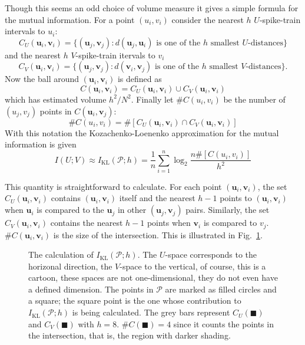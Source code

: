 \documentclass[12pt]{article}
\renewcommand{\u}{\mathbf{u}}
\renewcommand{\v}{\mathbf{v}}
\begin{document}
Though this seems an odd choice of volume measure it gives a simple
formula for the mutual information. For a point $(u_i,v_i)$ consider
the nearest $h$ $U$-spike-train intervals to $u_i$:
\begin{equation}
C_U(\u_i,\v_i)=\{(\u_j,\v_j): d(\u_j,\u_i)\mbox{ is one of the }h\mbox{ smallest $U$-distances} \}
\end{equation}
and the nearest $h$ $V$-spike-train itervals to $v_i$
\begin{equation}
C_V(\u_i,\v_i)=\{(\u_j,\v_j): d(\v_i,\v_j)\mbox{ is one of the }h\mbox{ smallest $V$-distances}\}.
\end{equation}
Now the ball around $(\u_i,\v_i)$ is defined as
\begin{equation}
C(\u_i,\v_i)=C_U(\u_i,\v_i)\cup C_V(\u_i,\v_i)
\end{equation}
which has estimated volume $h^2/N^2$. Finally let $\#C(u_i,v_i)$ be the
number of $(u_j,v_j)$ points in $C(\u_i,\v_j)$:
\begin{equation}
\#C(u_i,v_i)=\#[C_U(\u_i,\v_i)\cap C_V(\u_i,\v_i)]
\end{equation}
With this notation the  Kozachenko-Loenenko approximation for the mutual information is given
\begin{equation}
I(U;V)\approx I_{\text{KL}}(\mathcal{P};h)=\frac{1}{n}\sum_{i=1}^n\log_2{\frac{n\#[C(u_i,v_i)]}{h^2}}
\end{equation}

This quantity is straightforward to calculate. For each point
$(\u_i,\v_i)$, the set $C_U(\u_i,\v_i)$ contains $(\u_i,\v_i)$ itself
and the nearest $h-1$ points to $(\u_i,\v_i)$ when $\u_i$ is compared
to the $\u_j$ in other $(\u_j,\v_j)$ pairs. Similarly, the set
$C_V(\u_i,\v_i)$ contains the nearest $h-1$ points when $\v_i$ is
compared to $v_j$. $\#C(\u_i,\v_i)$ is the size of the
intersection. This is illustrated in Fig.~\ref{fig_region}.

\begin{figure}
\begin{center}

\end{center}
\caption{The calculation of $I_{\text{KL}}(\mathcal{P};h)$. The
  $U$-space corresponds to the horizonal direction, the $V$-space to
  the vertical, of course, this is a cartoon, these spaces are not
  one-dimensional, they do not even have a defined dimension. The
  points in $\mathcal{P}$ are marked as filled circles and a square;
  the square point is the one whose contribution to
  $I_{\text{KL}}(\mathcal{P};h)$ is being calculated. The grey bars
  represent $C_U(\blacksquare)$ and $C_V(\blacksquare)$ with $h=8$.
  $\#C(\blacksquare)=4$ since it counts the points in the
  intersection, that is, the region with darker
  shading.\label{fig_region}}
\end{figure}
\end{document}
